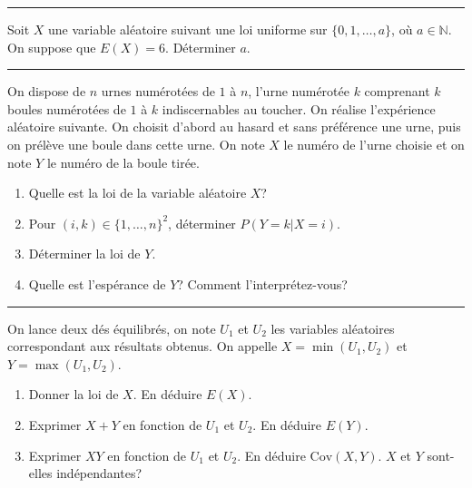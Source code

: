 \documentclass[../PolyS4.tex]{subfiles}
\begin{document}
\hfill\break
\hrule
\hfill\break




Soit $X$ une variable aléatoire suivant une loi uniforme sur $\{0,1,\dots,a\}$, où $a\in\mathbb N$. On suppose que $E(X)=6$. Déterminer $a$.\\





\hfill\break
\hrule
\hfill\break


On dispose de $n$ urnes numérotées de $1$ à $n$, l'urne numérotée $k$
comprenant $k$ boules numérotées de $1$ à $k$ indiscernables au toucher. On réalise l'expérience aléatoire suivante. On choisit d'abord au hasard et sans préférence une urne, puis on prélève une boule dans cette urne. On note $X$ le numéro de l'urne choisie et on note $Y$ le numéro de la boule tirée.
\begin{enumerate}
\item Quelle est la loi de la variable aléatoire $X$?
\item Pour $(i,k)\in\{1,\dots,n\}^2$, déterminer $P(Y=k|X=i)$.
\item Déterminer la loi de $Y$.
\item Quelle est l'espérance de $Y$? Comment l'interprétez-vous?\\
\end{enumerate}

\hfill\break
\hrule
\hfill\break


On lance deux dés équilibrés, on note $U_1$ et $U_2$ les variables aléatoires correspondant aux résultats obtenus.
On appelle $X=\min(U_1,U_2)$ et $Y=\max(U_1,U_2)$. 
\begin{enumerate}
 \item Donner la loi de $X$. En déduire $E(X)$.
\item Exprimer $X+Y$ en fonction de $U_1$ et $U_2$. En déduire $E(Y)$.
\item Exprimer $XY$ en fonction de $U_1$ et $U_2$. En déduire $\textrm{Cov}(X,Y)$. $X$ et $Y$ sont-elles indépendantes?\\
\end{enumerate}


\end{document}
